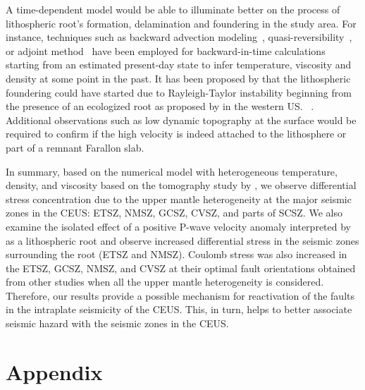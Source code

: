 \documentclass[draft,linenumbers]{agujournal2018}
\begin{document}
    
    A time-dependent model would be able to illuminate better on the process of lithospheric root's formation, delamination and foundering in the study area. For instance, techniques such as backward advection modeling~\citep[e.g.,][]{conrad2003seismic}, quasi-reversibility~\citep{glivsovic2016new}, or adjoint method~\citep[e.g.,][]{bunge2003mantle, liu2008reconstructing} have been employed for backward-in-time calculations starting from an estimated present-day state to infer temperature, viscosity and density at some point in the past. It has been proposed by \cite{Biryol_2016} that the lithospheric foundering could have started due to Rayleigh-Taylor instability beginning from the presence of an ecologized root as proposed by \citet{le2006mantle} in the western US. ~\citep{schmandt2010seismic}. 
    Additional observations such as low dynamic topography at the surface would be required to confirm if the high velocity is indeed attached to the lithosphere or part of a remnant Farallon slab.
    
    In summary, based on the numerical model with heterogeneous temperature, density, and viscosity based on the tomography study by \citet{Biryol_2016}, we observe differential stress concentration due to the upper mantle heterogeneity at the major seismic zones in the CEUS: ETSZ, NMSZ, GCSZ, CVSZ, and parts of SCSZ. We also examine the isolated effect of a positive P-wave velocity anomaly interpreted by \citet{Biryol_2016} as a lithospheric root and observe increased differential stress in the seismic zones surrounding the root (ETSZ and NMSZ). Coulomb stress was also increased in the ETSZ, GCSZ, NMSZ, and CVSZ at their optimal fault orientations obtained from other studies when all the upper mantle heterogeneity is considered. Therefore, our results provide a possible mechanism for reactivation of the faults in the intraplate seismicity of the CEUS. This, in turn, helps to better associate seismic hazard with the seismic zones in the CEUS.
    
\appendix
\section{Appendix}
\end{document}
